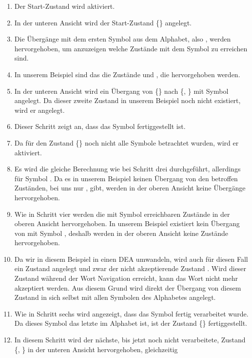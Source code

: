 \begin{enumerate}
  \item Der Start-Zustand  wird aktiviert.
  \item In der unteren Ansicht wird der Start-Zustand \{\} angelegt.
  \item Die Übergänge mit dem ersten Symbol aus dem Alphabet, also ,
  werden hervorgehoben, um anzuzeigen welche Zustände mit dem Symbol zu
  erreichen sind.
  \item In unserem Beispiel sind das die Zustände  und ,
  die hervorgehoben werden.
  \item In der unteren Ansicht wird ein Übergang von \{\} nach
  \{, \} mit Symbol  angelegt. Da dieser zweite
  Zustand in unserem Beispiel noch nicht existiert, wird er angelegt.
  \item Dieser Schritt zeigt an, dass das Symbol  fertiggestellt ist.
  \item Da für den Zustand \{\} noch nicht alle Symbole betrachtet
  wurden, wird er aktiviert.
  \item Es wird die gleiche Berechnung wie bei Schritt drei durchgeführt,
  allerdings für Symbol . Da es in unserem Beispiel keinen Übergang
  von den betroffen Zuständen, bei uns nur , gibt, werden in der
  oberen Ansicht keine Übergänge hervorgehoben.
  \item Wie in Schritt vier werden die mit Symbol  erreichbaren
  Zustände in der oberen Ansicht hervorgehoben. In unserem Beispiel existiert
  kein Übergang von  mit Symbol , deshalb werden in der
  oberen Ansicht keine Zustände hervorgehoben.
  \item Da wir in diesem Beispiel in einen DEA umwandeln, wird auch für diesen
  Fall ein Zustand angelegt und zwar der nicht akzeptierende Zustand
  \State{$\emptyset$}. Wird dieser Zustand während der Wort Navigation
  erreicht, kann das Wort nicht mehr akzeptiert werden. Aus diesem Grund wird
  direkt der Übergang von diesem Zustand in sich selbst mit allen Symbolen des
  Alphabetes angelegt.
  \item Wie in Schritt sechs wird angezeigt, dass das Symbol  fertig
  verarbeitet wurde. Da dieses Symbol das letzte im Alphabet ist, ist der
  Zustand \{\} fertiggestellt.
  \item In diesem Schritt wird der nächste, bis jetzt noch nicht verarbeitete,
  Zustand \{, \} in der unteren Ansicht hervorgehoben, gleichzeitig

\end{enumerate}
